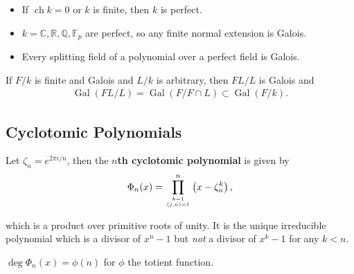 \begin{theorem}

\hfill

\begin{itemize}
\item
  If \(\operatorname{ch}k = 0\) or \(k\) is finite, then \(k\) is
  perfect.
\item
  \(k = {\mathbb{C}},{\mathbb{R}}, {\mathbb{Q}}, {\mathbb{F}}_p\) are
  perfect, so any finite normal extension is Galois.
\item
  Every splitting field of a polynomial over a perfect field is Galois.
\end{itemize}

\end{theorem}

\begin{proposition}

If \(F/k\) is finite and Galois and \(L/k\) is arbitrary, then \(FL/L\)
is Galois and
\begin{align*}
\operatorname{Gal}(FL/L) = \operatorname{Gal}(F / F\cap L) \subset \operatorname{Gal}(F/k)
.\end{align*}

\end{proposition}

\hypertarget{cyclotomic-polynomials}{%
\subsection{Cyclotomic Polynomials}\label{cyclotomic-polynomials}}

\begin{definition}

Let \(\zeta_n = e^{2\pi i/n}\), then the \textbf{\(n\)th cyclotomic
polynomial} is given by
\begin{align*}
\Phi_{n}(x)=\prod_{k=1 \atop (j, n)=1}^{n}\left(x- \zeta_n^k\right)
,\end{align*}

which is a product over primitive roots of unity. It is the unique
irreducible polynomial which is a divisor of \(x^n - 1\) but \emph{not}
a divisor of \(x^k-1\) for any \(k<n\).

\end{definition}

\begin{proposition}

\(\deg \Phi_n(x) = \phi(n)\) for \(\phi\) the totient function.

\end{proposition}

